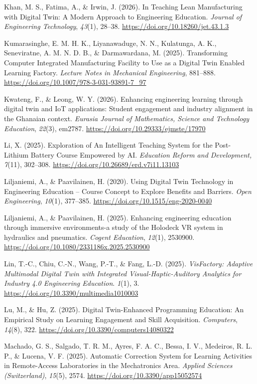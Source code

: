 Khan, M. S., Fatima, A., \& Irwin, J. (2026). In Teaching Lean
Manufacturing with Digital Twin: A Modern Approach to Engineering
Education. \emph{Journal of Engineering Technology}, \emph{43}(1), 28--38.
\url{https://doi.org/10.18260/jet.43.1.3}

Kumarasinghe, E. M. H. K., Liyanawaduge, N. N., Kulatunga, A. K.,
Seneviratne, A. M. N. D. B., \& Darmawardana, M. (2025). Transforming
Computer Integrated Manufacturing Facility to Use as a Digital Twin
Enabled Learning Factory. \emph{Lecture Notes in Mechanical Engineering},
881--888. \url{https://doi.org/10.1007/978-3-031-93891-7_97}

Kwateng, F., \& Leong, W. Y. (2026). Enhancing engineering learning
through digital twin and IoT applications: Student engagement and
industry alignment in the Ghanaian context. \emph{Eurasia Journal of
Mathematics, Science and Technology Education}, \emph{22}(3), em2787.
\url{https://doi.org/10.29333/ejmste/17970}

Li, X. (2025). Exploration of An Intelligent Teaching System for the
Post-Lithium Battery Course Empowered by AI. \emph{Education Reform and
Development,} \emph{7}(11), 302--308.
\url{https://doi.org/10.26689/erd.v7i11.13103}

Liljaniemi, A., \& Paavilainen, H. (2020). Using Digital Twin Technology
in Engineering Education -- Course Concept to Explore Benefits and
Barriers. \emph{Open Engineering}, \emph{10}(1), 377--385.
\url{https://doi.org/10.1515/eng-2020-0040}

Liljaniemi, A., \& Paavilainen, H. (2025). Enhancing engineering
education through immersive environments-a study of the Holodeck VR
system in hydraulics and pneumatics. \emph{Cogent Education}, \emph{12}(1),
2530900. \url{https://doi.org/10.1080/2331186x.2025.2530900}

Lin, T.-C., Chiu, C.-N., Wang, P.-T., \& Fang, L.-D. (2025). \emph{VisFactory:
Adaptive Multimodal Digital Twin with Integrated Visual-Haptic-Auditory
Analytics for Industry 4.0 Engineering Education}. \emph{1}(1), 3.
\url{https://doi.org/10.3390/multimedia1010003}

Lu, M., \& Hu, Z. (2025). Digital Twin-Enhanced Programming Education: An
Empirical Study on Learning Engagement and Skill Acquisition.
\emph{Computers}, \emph{14}(8), 322. \url{https://doi.org/10.3390/computers14080322}

Machado, G. S., Salgado, T. R. M., Ayres, F. A. C., Bessa, I. V.,
Medeiros, R. L. P., \& Lucena, V. F. (2025). Automatic Correction System
for Learning Activities in Remote-Access Laboratories in the
Mechatronics Area. \emph{Applied Sciences (Switzerland)}, \emph{15}(5), 2574.
\url{https://doi.org/10.3390/app15052574}

